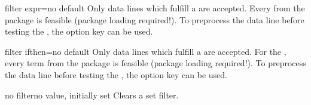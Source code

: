 \documentclass[a4paper,11pt]{ltxdoc}
\begin{document}
\medskip
\begin{docCsvKey}[][doc new=2016-07-01]{filter expr}{=}{no default}
  Only data lines which fulfill a  are accepted.
  Every 
  from the  package is feasible (package loading required!).
  To preprocess the data line before testing the ,
  the option key  can be used.
\begin{dispExample}
\end{dispExample}
\end{docCsvKey}


\clearpage
\begin{docCsvKey}[][doc new=2016-07-01]{filter ifthen}{=}{no default}
  Only data lines which fulfill a  are accepted.
  For the , every term from the  package
  is feasible (package loading required!).
  To preprocess the data line before testing the ,
  the option key  can be used.

\begin{dispExample}
\end{dispExample}
\end{docCsvKey}


\begin{docCsvKey}{no filter}{}{no value, initially set}
  Clears a set filter.
\end{docCsvKey}
\end{document}
